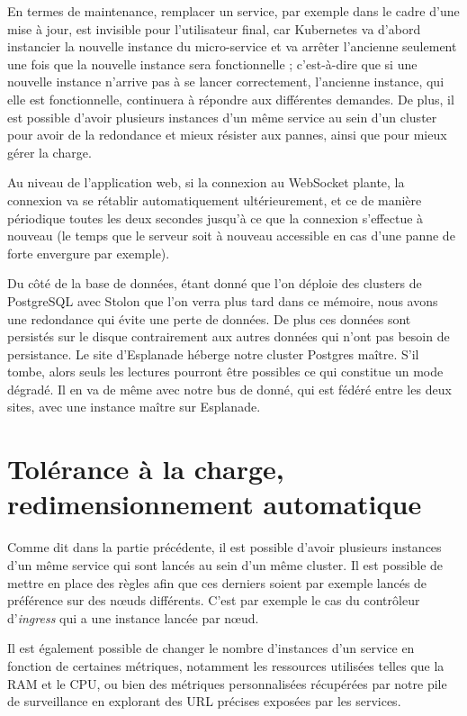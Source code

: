 En termes de maintenance, remplacer un service, par exemple dans le
cadre d'une mise à jour, est invisible pour l'utilisateur final, car
Kubernetes va d'abord instancier la nouvelle instance du micro-service
et va arrêter l'ancienne seulement une fois que la nouvelle instance
sera fonctionnelle ; c'est-à-dire que si une nouvelle instance n'arrive
pas à se lancer correctement, l'ancienne instance, qui elle est
fonctionnelle, continuera à répondre aux différentes demandes. De plus,
il est possible d'avoir plusieurs instances d'un même service au sein
d'un cluster pour avoir de la redondance et mieux résister aux pannes,
ainsi que pour mieux gérer la charge.

Au niveau de l'application web, si la connexion au WebSocket plante, la
connexion va se rétablir automatiquement ultérieurement, et ce de
manière périodique toutes les deux secondes jusqu'à ce que la connexion
s'effectue à nouveau (le temps que le serveur soit à nouveau accessible
en cas d'une panne de forte envergure par exemple).

Du côté de la base de données, étant donné que l'on déploie des clusters
de PostgreSQL avec Stolon que l'on verra plus tard dans ce mémoire, nous
avons une redondance qui évite une perte de données. De plus ces données
sont persistés sur le disque contrairement aux autres données qui n'ont
pas besoin de persistance. Le site d'Esplanade héberge notre cluster
Postgres maître. S'il tombe, alors seuls les lectures pourront être
possibles ce qui constitue un mode dégradé. Il en va de même avec notre
bus de donné, qui est fédéré entre les deux sites, avec une instance
maître sur Esplanade.

\section{Tolérance à la charge, redimensionnement automatique}

Comme dit dans la partie précédente, il est possible d'avoir plusieurs
instances d'un même service qui sont lancés au sein d'un même cluster.
Il est possible de mettre en place des règles afin que ces derniers
soient par exemple lancés de préférence sur des nœuds différents. C'est
par exemple le cas du contrôleur d'\textit{ingress} qui a une instance
lancée par nœud.

Il est également possible de changer le nombre d'instances d'un service
en fonction de certaines métriques, notamment les ressources utilisées
telles que la RAM et le CPU, ou bien des métriques personnalisées
récupérées par notre pile de surveillance en explorant des URL précises
exposées par les services.

